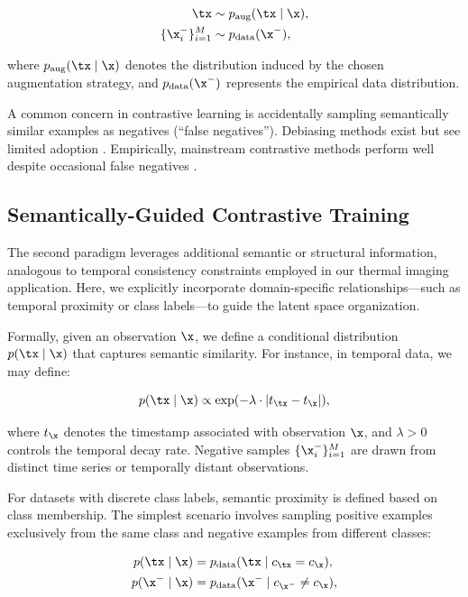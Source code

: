 \begin{align}
    \tx                & \sim p_{\text{aug}}(\tx \mid \x), \\
    \{\x_i^-\}_{i=1}^M & \sim p_{\text{data}}(\x^-),
\end{align}

where $p_{\text{aug}}(\tx \mid \x)$ denotes the distribution induced by the chosen augmentation strategy, and $p_{\text{data}}(\x^-)$ represents the empirical data distribution.


A common concern in contrastive learning is accidentally sampling semantically similar examples as negatives (“false negatives”). Debiasing methods exist \cite{NEURIPS2020_63c3ddcc} but see limited adoption \cite{gui2024survey}. Empirically, mainstream contrastive methods perform well despite occasional false negatives \cite{gui2024survey}.

\subsection{Semantically-Guided Contrastive Training}

The second paradigm leverages additional semantic or structural information, analogous to temporal consistency constraints employed in our thermal imaging application. Here, we explicitly incorporate domain-specific relationships—such as temporal proximity or class labels—to guide the latent space organization.

Formally, given an observation $\x$, we define a conditional distribution $p(\tx \mid \x)$ that captures semantic similarity. For instance, in temporal data, we may define:

\begin{equation}
    p(\tx \mid \x) \propto \exp(-\lambda \cdot |t_{\tx} - t_{\x}|),
\end{equation}

where $t_{\x}$ denotes the timestamp associated with observation $\x$, and $\lambda > 0$ controls the temporal decay rate. Negative samples $\{\x_i^-\}_{i=1}^M$ are drawn from distinct time series or temporally distant observations.

For datasets with discrete class labels, semantic proximity is defined based on class membership. The simplest scenario involves sampling positive examples exclusively from the same class and negative examples from different classes:

\begin{align}
    p(\tx \mid \x)  & = p_{\text{data}}(\tx \mid c_{\tx} = c_{\x}),      \\
    p(\x^- \mid \x) & = p_{\text{data}}(\x^- \mid c_{\x^-} \neq c_{\x}),
\end{align}

